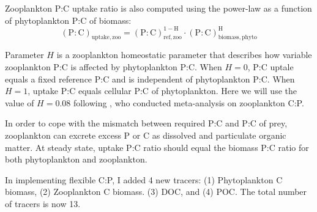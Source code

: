 \documentclass[a4paper]{article}
\begin{document}
Zooplankton P:C uptake ratio is also computed using the power-law as a function of phytoplankton P:C of biomass:
\begin{equation}
   \mathrm{(P:C)_{uptake,zoo}} = \mathrm{(P:C)_{ref,zoo}^{1-H}\cdot (P:C)_{biomass,phyto}^{H}} \label{eq:eq_pczoo}
\end{equation}

Parameter $H$ is a zooplankton homeostatic parameter that describes how variable zooplankton P:C is affected by phytoplankton P:C. When $H = 0$, P:C uptale equals a fixed reference P:C and is independent of phytoplankton P:C. When $H = 1$, uptake P:C equals cellular P:C of phytoplankton. Here we will use the value of $H = 0.08$ following \cite{Persson10}, who conducted meta-analysis on zooplankton C:P.

In order to cope with the mismatch between required P:C and P:C of prey, zooplankton can excrete excess P or C as dissolved and particulate organic matter. At steady state, uptake P:C ratio should equal the biomass P:C ratio for both phytoplankton and zooplankton.

In implementing flexible C:P, I added 4 new tracers: (1) Phytoplankton C biomass, (2) Zooplankton C biomass. (3) DOC, and (4) POC. The total number of tracers is now 13. 
\end{document}
